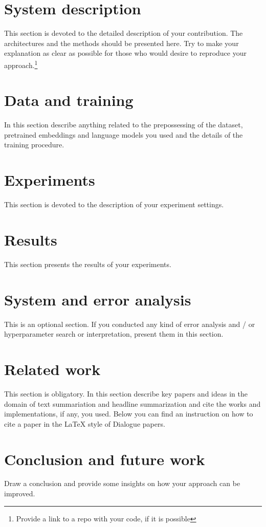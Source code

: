 \documentclass{dialogue}
\begin{document}
\section{System description}
This section is devoted to the detailed description of your contribution. The architectures and the methods should be presented here. Try to make your explanation as clear as possible for those who would desire to reproduce your approach.\footnote{Provide a link to a repo with your code, if it is possible}

\section{Data and training}
In this section describe anything related to the prepossessing of the dataset, pretrained embeddings and language models you used and the details of the training procedure.

\section{Experiments}
This section is devoted to the description of your experiment settings.

\section{Results}
This section presents the results of your experiments. 

\section{System and error analysis}
This is an optional section. If you conducted any kind of error analysis and / or hyperparameter search or interpretation, present them in this section. 

\section{Related work}
This section is obligatory. In this section describe key papers and ideas in the domain of text summariation and headline summarization and cite the works and implementations, if any, you used. Below you can find an instruction on how to cite a paper in the {\LaTeX} style of Dialogue papers.

\section{Conclusion and future work}
Draw a conclusion and provide some insights on how your approach can be improved. 
\end{document}
